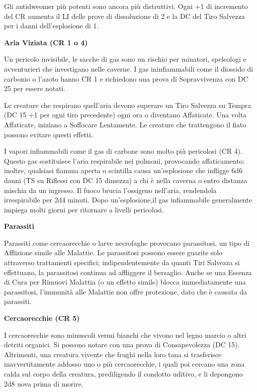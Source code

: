 \documentclass[a4paper,11pt,twoside,openany]{book}
\begin{document}
{Gli antidweomer più potenti sono ancora più distruttivi. Ogni +1 di incremento del CR aumenta il LI delle prove di dissoluzione di 2 e la DC del Tiro Salvezza per i danni dell'esplosione di 1.

\textbf{Aria Viziata (CR 1 o 4)}

Un pericolo invisibile, le sacche di gas sono un rischio per minatori, speleologi e avventurieri che investigano nelle caverne. I gas ininfiammabili come il diossido di carbonio o l'azoto hanno CR 1 e richiedono una prova di Sopravvivenza con DC 25 per essere notati. 

Le creature che respirano quell'aria devono superare un Tiro Salvezza su Tempra (DC 15 +1 per ogni tiro precedente) ogni ora o diventano Affaticate. Una volta Affaticate, iniziano a Soffocare Lentamente. Le creature che trattengono il fiato possono evitare questi effetti.

I vapori infiammabili come il gas di carbone sono molto più pericolosi (CR 4). Questo gas sostituisce l'aria respirabile nei polmoni, provocando affaticamento: inoltre, qualsiasi fiamma aperta o scintilla causa un'esplosione che infligge 6d6 danni (TS su Riflessi con DC 15 dimezza) a chi è nella caverna o entro distanza mischia da un ingresso. Il fuoco brucia l'ossigeno nell'aria, rendendola irrespirabile per 2d4 minuti. Dopo un'esplosione,il gas infiammabile generalmente impiega molti giorni per ritornare a livelli pericolosi.

\textbf{Parassiti}

Parassiti come cercaorecchie o larve necrofaghe provocano parassitosi, un tipo di Afflizione simile alle Malattie. Le parassitosi possono essere guarite solo attraverso trattamenti specifici; indipendentemente da quanti Tiri Salvezza si effettuano, la parassitosi continua ad affliggere il bersaglio. Anche se una Essenza di Cura per Rimuovi Malattia (o un effetto simile) blocca immediatamente una parassitosi, l'immunità alle Malattie non offre protezione, dato che è causata da parassiti.

\textbf{Cercaorecchie (CR 5)}

I cercaorecchie sono minuscoli vermi bianchi che vivono nel legno marcio o altri detriti organici. Si possono notare con una prova di Consapevolezza (DC 15). Altrimenti, una creatura vivente che frughi nella loro tana si trasferisce inavvertitamente addosso uno o più cercaorecchie, i quali poi cercano una zona calda sul corpo della creatura, prediligendo il condotto uditivo, e li depongono 2d8 uova prima di morire. 

}
\end{document}
